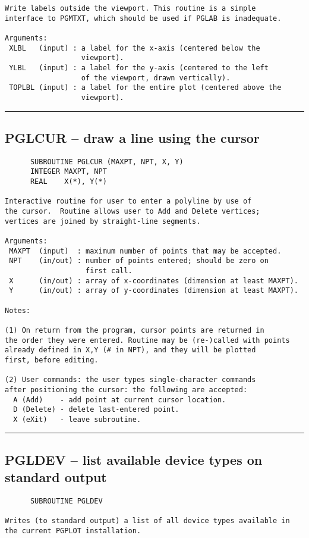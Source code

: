 {\begin{verbatim}
Write labels outside the viewport. This routine is a simple
interface to PGMTXT, which should be used if PGLAB is inadequate.

Arguments:
 XLBL   (input) : a label for the x-axis (centered below the
                  viewport).
 YLBL   (input) : a label for the y-axis (centered to the left
                  of the viewport, drawn vertically).
 TOPLBL (input) : a label for the entire plot (centered above the
                  viewport).
\end{verbatim}
\hrule


\subsection*{PGLCUR -- draw a line using the cursor }
\begin{verbatim}
      SUBROUTINE PGLCUR (MAXPT, NPT, X, Y)
      INTEGER MAXPT, NPT
      REAL    X(*), Y(*)

Interactive routine for user to enter a polyline by use of
the cursor.  Routine allows user to Add and Delete vertices;
vertices are joined by straight-line segments.

Arguments:
 MAXPT  (input)  : maximum number of points that may be accepted.
 NPT    (in/out) : number of points entered; should be zero on
                   first call.
 X      (in/out) : array of x-coordinates (dimension at least MAXPT).
 Y      (in/out) : array of y-coordinates (dimension at least MAXPT).

Notes:

(1) On return from the program, cursor points are returned in
the order they were entered. Routine may be (re-)called with points
already defined in X,Y (# in NPT), and they will be plotted
first, before editing.

(2) User commands: the user types single-character commands
after positioning the cursor: the following are accepted:
  A (Add)    - add point at current cursor location.
  D (Delete) - delete last-entered point.
  X (eXit)   - leave subroutine.
\end{verbatim}
\hrule


\subsection*{PGLDEV -- list available device types on standard output }
\begin{verbatim}
      SUBROUTINE PGLDEV

Writes (to standard output) a list of all device types available in
the current PGPLOT installation.


\end{verbatim}}
